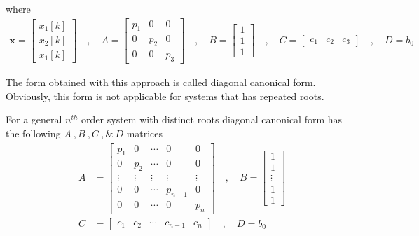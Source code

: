 \documentclass[twoside]{article}
\begin{document}
%
where 
%
\begin{align*}
\mathbf{x} = \left[ \begin{array}{c} x_1[k] \\ x_2[k] \\
x_1[k] \end{array} \right] \quad , \quad
A = \left[ \begin{array}{ccc} p_1 & 0 & 0 \\ 0 & p_2 & 0
    \\ 0 & 0 & p_3 \end{array} \right]
\quad , \quad 
B = \left[ \begin{array}{c} 1 \\ 1
    \\ 1 \end{array} \right]
\quad , \quad
C = \left[ \begin{array}{ccc} c_1 & c_2 & c_3 \end{array} \right]
\quad , \quad
D = b_0
\end{align*}
%

The form obtained with this approach is called
diagonal canonical form. Obviously, this form is
not applicable for systems that has repeated roots.

For a general $n^{th}$ order system with distinct
roots diagonal canonical form has the following 
$A \ ,  B \ ,  C \ , \& \ D$ matrices
%
\begin{align*}
A &= \left[ \begin{array}{ccccc} p_1 & 0 & \cdots & 0 & 0
              \\ 0 & p_2 & \cdots & 0 & 0
\\ \vdots & \vdots & \vdots & \vdots & \vdots
\\ 0 & 0 & \cdots & p_{n-1} & 0
    \\ 0 & 0 & \cdots & 0 & p_n \end{array} \right]
\quad , \quad 
B = \left[ \begin{array}{c} 1 \\ 1 \\ \vdots \\ 1 \\  1
\end{array} \right]
\\ C &= \left[ \begin{array}{ccccc} c_1 & c_2 & \cdots &  c_{n-1} & c_n \end{array} \right]
\quad , \quad
D = b_0
\end{align*}
%
\end{document}
